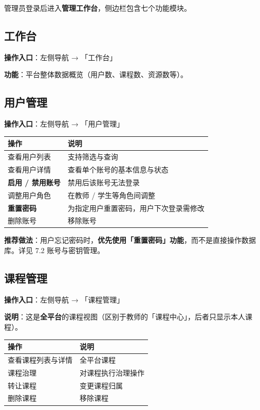 \documentclass[UTF8,a4paper,11pt]{ctexrep}
\begin{document}
管理员登录后进入\textbf{管理工作台}，侧边栏包含七个功能模块。


\subsection{工作台}

\textbf{操作入口}：左侧导航 → 「工作台」

\textbf{功能}：平台整体数据概览（用户数、课程数、资源数等）。


\subsection{用户管理}

\textbf{操作入口}：左侧导航 → 「用户管理」

\begin{center}
\small
\begin{tabularx}{\linewidth}{@{}XX@{}}
\toprule
操作 & 说明 \\
\midrule
查看用户列表 & 支持筛选与查询 \\
查看用户详情 & 查看单个账号的基本信息与状态 \\
\textbf{启用 / 禁用账号} & 禁用后该账号无法登录 \\
调整用户角色 & 在教师 / 学生等角色间调整 \\
\textbf{重置密码} & 为指定用户重置密码，用户下次登录需修改 \\
删除账号 & 移除账号 \\
\bottomrule
\end{tabularx}
\end{center}
\begin{notebox}
\textbf{推荐做法}：用户忘记密码时，\textbf{优先使用「重置密码」功能}，而不是直接操作数据库。详见 7.2 账号与密钥管理。

\end{notebox}


\subsection{课程管理}

\textbf{操作入口}：左侧导航 → 「课程管理」

\textbf{说明}：这是\textbf{全平台}的课程视图（区别于教师的「课程中心」，后者只显示本人课程）。

\begin{center}
\small
\begin{tabularx}{\linewidth}{@{}XX@{}}
\toprule
操作 & 说明 \\
\midrule
查看课程列表与详情 & 全平台课程 \\
课程治理 & 对课程执行治理操作 \\
转让课程 & 变更课程归属 \\
删除课程 & 移除课程 \\
\bottomrule
\end{tabularx}
\end{center}
\end{document}
